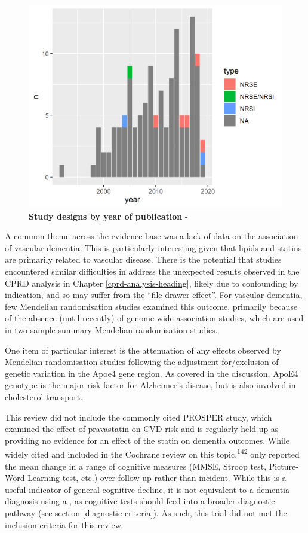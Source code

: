 \documentclass[a4paper, twoside]{templates/ociamthesis}
\begin{document}
\begin{figure}[H]
\includegraphics[width=1\linewidth]{figures/sys-rev/type_by_year} \caption[Study designs by year of publication]{\textbf{Study designs by year of publication} -}\label{fig:typeByYear}
\end{figure}

A common theme across the evidence base was a lack of data on the association of vascular dementia. This is particularly interesting given that lipids and statins are primarily related to vascular disease. There is the potential that studies encountered similar difficulties in address the unexpected results observed in the CPRD analysis in Chapter \ref{cprd-analysis-heading}, likely due to confounding by indication, and so may suffer from the ``file-drawer effect''. For vascular dementia, few Mendelian randomisation studies examined this outcome, primarily because of the absence (until recently) of genome wide association studies, which are used in two sample summary Mendelian randomisation studies.

One item of particular interest is the attenuation of any effects observed by Mendelian randomisation studies following the adjustment for/exclusion of genetic variation in the Apoe4 gene region. As covered in the discussion, ApoE4 genotype is the major risk factor for Alzheimer's disease, but is also involved in cholesterol transport.

This review did not include the commonly cited PROSPER study, which examined the effect of pravastatin on CVD risk and is regularly held up as providing no evidence for an effect of the statin on dementia outcomes. While widely cited and included in the Cochrane review on this topic,\textsuperscript{\protect\hyperlink{ref-mcguinness2016}{142}} only reported the mean change in a range of cognitive measures (MMSE, Stroop test, Picture-Word Learning test, etc.) over follow-up rather than incident. While this is a useful indicator of general cognitive decline, it is not equivalent to a dementia diagnosis using a , as cognitive tests should feed into a broader diagnostic pathway (see section \ref{diagnostic-criteria}). As such, this trial did not met the inclusion criteria for this review.
\end{document}
